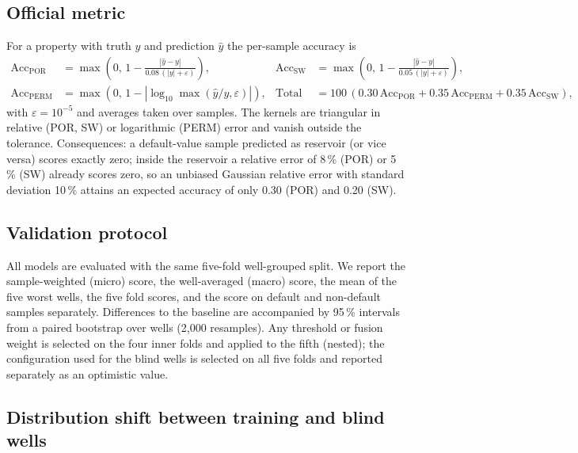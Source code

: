 \documentclass[preprint,12pt]{elsarticle}
\begin{document}
\subsection{Official metric}
\label{sec:metric}

For a property with truth $y$ and prediction $\hat y$ the per-sample accuracy is
\begin{align}
\mathrm{Acc}_{\mathrm{POR}} &= \max\!\left(0,\,1-\frac{|\hat y-y|}{0.08\,(|y|+\varepsilon)}\right), &
\mathrm{Acc}_{\mathrm{SW}} &= \max\!\left(0,\,1-\frac{|\hat y-y|}{0.05\,(|y|+\varepsilon)}\right), \\
\mathrm{Acc}_{\mathrm{PERM}} &= \max\!\left(0,\,1-\left|\log_{10}\max\!\left(\hat y/y,\varepsilon\right)\right|\right), &
\mathrm{Total} &= 100\,(0.30\,\mathrm{Acc}_{\mathrm{POR}}+0.35\,\mathrm{Acc}_{\mathrm{PERM}}+0.35\,\mathrm{Acc}_{\mathrm{SW}}),
\end{align}
with $\varepsilon=10^{-5}$ and averages taken over samples. The kernels are triangular in relative (POR, SW) or logarithmic (PERM) error and vanish outside the tolerance. Consequences: a default-value sample predicted as reservoir (or vice versa) scores exactly zero; inside the reservoir a relative error of 8\,\% (POR) or 5\,\% (SW) already scores zero, so an unbiased Gaussian relative error with standard deviation 10\,\% attains an expected accuracy of only 0.30 (POR) and 0.20 (SW).

\subsection{Validation protocol}
\label{sec:protocol}

All models are evaluated with the same five-fold well-grouped split. We report the sample-weighted (micro) score, the well-averaged (macro) score, the mean of the five worst wells, the five fold scores, and the score on default and non-default samples separately. Differences to the baseline are accompanied by 95\,\% intervals from a paired bootstrap over wells (2,000 resamples). Any threshold or fusion weight is selected on the four inner folds and applied to the fifth (nested); the configuration used for the blind wells is selected on all five folds and reported separately as an optimistic value.

\subsection{Distribution shift between training and blind wells}
\label{sec:drift}
\end{document}
